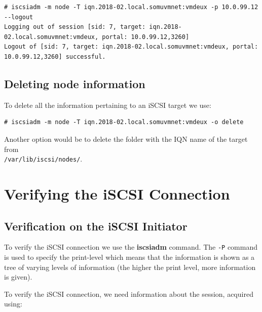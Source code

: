 \vspace{-15pt}
\begin{verbatim}
# iscsiadm -m node -T iqn.2018-02.local.somuvmnet:vmdeux -p 10.0.99.12 --logout
Logging out of session [sid: 7, target: iqn.2018-02.local.somuvmnet:vmdeux, portal: 10.0.99.12,3260]
Logout of [sid: 7, target: iqn.2018-02.local.somuvmnet:vmdeux, portal: 10.0.99.12,3260] successful.
\end{verbatim}
\vspace{-10pt}	

\subsection{Deleting node information}
To delete all the information pertaining to an iSCSI target we use:

\vspace{-15pt}
\begin{verbatim}
# iscsiadm -m node -T iqn.2018-02.local.somuvmnet:vmdeux -o delete
\end{verbatim}
\vspace{-10pt}	

\noindent
Another option would be to delete the folder with the IQN name of the target from \\\verb|/var/lib/iscsi/nodes/|.

	\section{Verifying the iSCSI Connection}	
\subsection{Verification on the iSCSI Initiator}
To verify the iSCSI connection we use the \textbf{iscsiadm} command. The \verb|-P| command is used to specify the print-level which means that the information is shown as a tree of varying levels of information (the higher the print level, more information is given). 

To verify the iSCSI connection, we need information about the session, acquired using:

